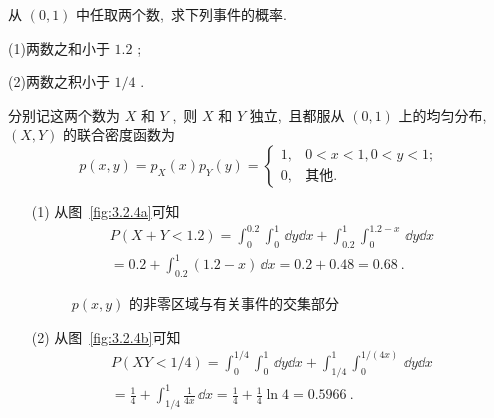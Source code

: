    \begin{example}\label{exam:3.2.8}
   	从 $(0,1)$ 中任取两个数,\ 求下列事件的概率.
   	
   	(1)两数之和小于 $1.2$ ;
   	
   	(2)两数之积小于 $1/4$ .
   \end{example}
   \begin{solution}
   	分别记这两个数为 $X$ 和 $Y$ ,\ 则 $X$ 和 $Y$ 独立,\ 且都服从 $(0,1)$ 上的均匀分布,\ $(X,Y)$ 的联合密度函数为
   	\begin{equation*}
   		p(x,y)=p_{X}(x)p_{Y}(y)=
   		\begin{cases}
   		1, & 0<x<1,0<y<1;\\
   		0, & \text{其他}.
   		\end{cases}
   	\end{equation*}
   	\begin{itemize}
   		\item[(1)] 从图~\ref{fig:3.2.4a}可知
   		\begin{align*}
   			P(X+Y<1.2)=\int_{0}^{0.2}\int_{0}^{1}\,\dd y\dd x+\int_{0.2}^{1}\int_{0}^{1.2-x}\,\dd y\dd x\\
   			=0.2+\int_{0.2}^{1}(1.2-x)\,\dd x=0.2+0.48=0.68\ .
   		\end{align*}
   		\begin{figure}[h]
   			\centering
   			\qquad
   			\caption{ $p(x,y)$ 的非零区域与有关事件的交集部分}\label{fig:3.2.4}
   		\end{figure}
   	\item[(2)] 从图~\ref{fig:3.2.4b}可知
   	\begin{align*}
   		P(XY<1/4)=\int_{0}^{1/4}\int_{0}^{1}\,\dd y\dd x+\int_{1/4}^{1}\int_{0}^{1/(4x)}\,\dd y\dd x\\
   		=\frac{1}{4}+\int_{1/4}^{1}\frac{1}{4x}\,\dd x=\frac{1}{4}+\frac{1}{4}\ln4=0.5966\ .
   	\end{align*}
   	\end{itemize}
   \end{solution}

